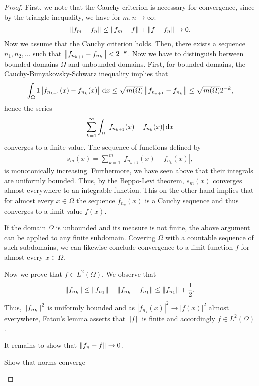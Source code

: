 \begin{proof}
  First, we note that the Cauchy criterion is necessary for
  convergence, since by the triangle inequality, we have for
  $m,n\to\infty$:
  \begin{gather*}
    \left\|f_m-f_n\right\| \le \left\|f_m-f\right\| + \left\|f-f_n\right\| \to 0.
  \end{gather*}
  Now we assume that the Cauchy criterion holds. Then, there exists
  a sequence $n_1,n_2,\dots$ such that $\left\|f_{n_{k+1}}- f_{n_k}\right\|
  <2^{-k}$. Now we have to distinguish between bounded domains
  $\Omega$ and unbounded domains. First, for bounded domains, the
  Cauchy-Bunyakovsky-Schwarz inequality implies that
  \begin{gather*}
    \int_\Omega 1 \left|f_{n_{k+1}}(x)- f_{n_k}(x)\right|\,\mathrm{d} x \le \sqrt{m(\Omega)}
    \left\|f_{n_{k+1}}- f_{n_k}\right\| \le \sqrt{m(\Omega)}2^{-k},
  \end{gather*}
  hence the series
  \begin{gather*}
    \sum_{k=1}^\infty \int_\Omega |f_{n_{k+1}}(x)- f_{n_k}(x)|\,\mathrm{d} x
  \end{gather*}
  converges to a finite value. The sequence of functions defined by
  \begin{gather*}
    s_m(x) = \sum_{k=1}^m |f_{n_{k+1}}(x)- f_{n_k}(x)|,
  \end{gather*}
  is monotonically increasing. Furthermore, we have seen above that
  their integrals are uniformly bounded. Thus, by the Beppo-Levi
  theorem, $s_m(x)$ converges almost everywhere to an integrable
  function. This on the other hand implies that for almost every $x\in
  \Omega$ the sequence $f_{n_k}(x)$ is a Cauchy sequence and thus
  converges to a limit value $f(x)$.
  
  If the domain $\Omega$ is unbounded and its measure is not finite,
  the above argument can be applied to any finite subdomain. Covering
  $\Omega$ with a countable sequence of such subdomains, we can
  likewise conclude convergence to a limit function $f$ for
  almost every $x\in\Omega$.

  Now we prove that $f\in L^2(\Omega)$. We observe that
  \begin{gather*}
    \left\|f_{n_k}\right\| \le \left\|f_{n_1}\right\| + \left\|f_{n_k}-f_{n_1}\right\| \le \left\|f_{n_1}\right\|+\frac12.
  \end{gather*}
  Thus, $\left\|f_{n_k}\right\|^2$ is uniformly bounded and as $|f_{n_k}(x)|^2
  \to |f(x)|^2$ almost everywhere, Fatou's lemma asserts that
  $\left\|f\right\|$ is finite and accordingly $f\in L^2(\Omega)$.

  It remains to show that $\left\|f_n-f\right\|\to 0$.
  \begin{todo}
    Show that norms converge
  \end{todo}
\end{proof}


